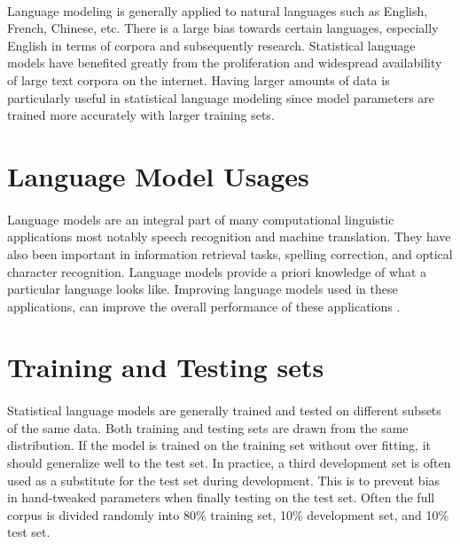 \paragraph{}
Language modeling is generally applied to natural languages such as English, French, Chinese, etc. There is a large bias towards certain languages, especially English in terms of corpora and subsequently research. Statistical language models have benefited greatly from the proliferation and widespread availability of large text corpora on the internet.  Having larger amounts of data is particularly useful in statistical language modeling since model parameters are trained more accurately with larger training sets. 

\section{Language Model Usages}
\paragraph{}
Language models are an integral part of many computational linguistic applications most notably speech recognition and machine translation. They have also been important in information retrieval tasks, spelling correction, and optical character recognition. Language models provide a priori knowledge of what a particular language looks like. Improving language models used in these applications, can improve the overall performance of these applications \cite{Jurafsky2009}. 

\section{Training and Testing sets}
\paragraph{}
Statistical language models are generally trained and tested on different subsets of the same data. Both training and testing sets are drawn from the same distribution. If the model is trained on the training set without over fitting, it should generalize well to the test set. In practice, a third development set is often used as a substitute for the test set during development. This is to prevent bias in hand-tweaked parameters when finally testing on the test set. Often the full corpus is divided randomly into 80\% training set, 10\% development set, and 10\% test set.

